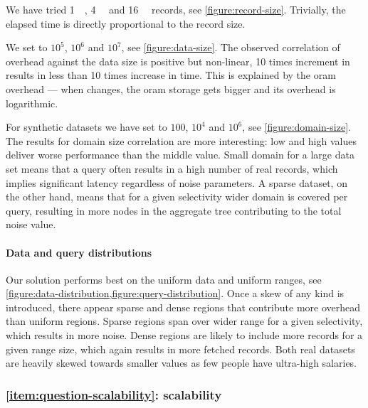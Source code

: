 				We have tried \SI{1}{\kibi\byte}, \SI{4}{\kibi\byte} and \SI{16}{\kibi\byte} records, see \cref{figure:record-size}.
				Trivially, the elapsed time is directly proportional to the record size.

				We set \dataSize{} to $10^5$, $10^6$ and $10^7$, see \cref{figure:data-size}.
				The observed correlation of overhead against the data size is positive but non-linear, 10 times increment in \dataSize{} results in less than 10 times increase in time.
				This is explained by the \acrshort{oram} overhead --- when \dataSize{} changes, the \acrshort{oram} storage gets bigger and its overhead is logarithmic.

				For synthetic datasets we have set \domainSize{} to $100$, $10^4$ and $10^6$, see \cref{figure:domain-size}.
				The results for domain size correlation are more interesting: low and high values deliver worse performance than the middle value.
				Small domain for a large data set means that a query often results in a high number of real records, which implies significant latency regardless of noise parameters.
				A sparse dataset, on the other hand, means that for a given selectivity wider domain is covered per query, resulting in more nodes in the aggregate tree contributing to the total noise value.

			

			\paragraph*{Data and query distributions}

				Our solution performs best on the uniform data and uniform ranges, see \cref{figure:data-distribution,figure:query-distribution}.
				Once a skew of any kind is introduced, there appear sparse and dense regions that contribute more overhead than uniform regions.
				Sparse regions span over wider range for a given selectivity, which results in more noise.
				Dense regions are likely to include more records for a given range size, which again results in more fetched records.
				Both real datasets are heavily skewed towards smaller values as few people have ultra-high salaries.

		\subsubsection*{\textbf{\texorpdfstring{\ref{item:question-scalability}:}{} scalability}}

			

